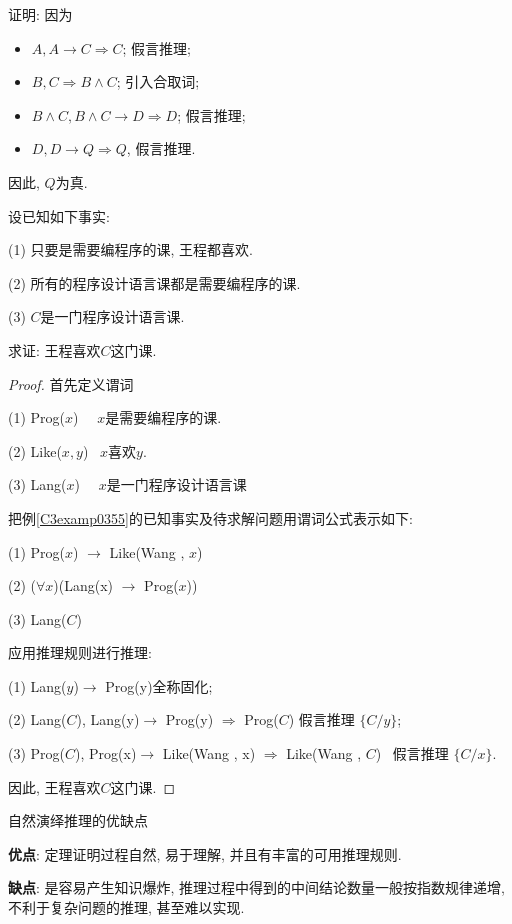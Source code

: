 证明: 因为
\begin{itemize}
    \item $A, A\rightarrow C\Rightarrow  C$;                    假言推理;
    \item $B,  C\Rightarrow  B\wedge C$;                        引入合取词;
    \item $B\wedge C, B\wedge C\rightarrow D \Rightarrow  D$;  假言推理;
    \item $D,  D\rightarrow Q \Rightarrow  Q$,                 假言推理.
\end{itemize}
因此, $Q$为真.
\begin{example}
设已知如下事实:

\quad   (1) 只要是需要编程序的课, 王程都喜欢.

\quad   (2) 所有的程序设计语言课都是需要编程序的课.

\quad   (3) $C$是一门程序设计语言课.

求证: 王程喜欢$C$这门课.
\end{example}

\begin{proof}
首先定义谓词

\quad   (1) Prog($x$)   \,\,\,\,    $x$是需要编程序的课.

\quad   (2) Like($x, y$)\,\,\,    $x$喜欢$y$.

\quad   (3) Lang($x$)   \,\,\,\,    $x$是一门程序设计语言课

把例\ref{C3examp0355}的已知事实及待求解问题用谓词公式表示如下:

\quad   (1) Prog($x$) $\rightarrow$ Like(Wang , $x$)

\quad   (2) ($\forall x$)(Lang(x) $\rightarrow$ Prog($x$))

\quad   (3) Lang($C$)

应用推理规则进行推理:

\quad   (1) Lang($y$)$\rightarrow$ Prog(y)\qquad\qquad\qquad\qquad\qquad\qquad\qquad   全称固化;

\quad   (2) Lang($C$), Lang(y)$\rightarrow$ Prog(y) $\Rightarrow$  Prog($C$) \qquad\qquad\qquad  假言推理  $\{C/y\}$;

\quad   (3) Prog($C$),  Prog(x)$\rightarrow$ Like(Wang , x) $\Rightarrow$  Like(Wang , $C$)\,\,\,  假言推理 $ \{C/x\}$.

因此, 王程喜欢$C$这门课.
\end{proof}

\begin{remark}自然演绎推理的优缺点

\textcolor[rgb]{0,0,1}{\textbf{优点}}: 定理证明过程自然, 易于理解, 并且有丰富的可用推理规则.

\textcolor[rgb]{0,0,1}{\textbf{缺点}}: 是容易产生知识爆炸, 推理过程中得到的中间结论数量一般按指数规律递增, 不利于复杂问题的推理, 甚至难以实现.
\end{remark}

